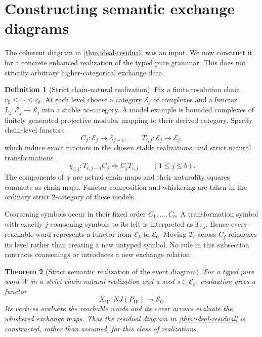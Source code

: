 \documentclass[11pt]{article}
\newtheorem{theorem}{Theorem}[section]
\theoremstyle{definition}
\newtheorem{definition}[theorem]{Definition}
\theoremstyle{remark}
\begin{document}
\section{Constructing semantic exchange diagrams}\label{sec:strict-semantics}

The coherent diagram in \cref{thm:ideal-residual} was an input. We now construct it for a concrete enhanced realization of the typed pure grammar. This does not strictify arbitrary higher-categorical exchange data.

\begin{definition}[Strict chain-natural realization]\label{def:strict-chain-realization}
Fix a finite resolution chain $r_0\le\cdots\le r_b$. At each level choose a category $\mathcal E_j$ of complexes and a functor $L_j:\mathcal E_j\to\mathcal S_j$ into a stable $\infty$-category. A model example is bounded complexes of finitely generated projective modules mapping to their derived category. Specify chain-level functors
\[
 C_j:\mathcal E_j\to\mathcal E_{j-1},\qquad
 T_{i,j}:\mathcal E_j\to\mathcal E_j,
\]
which induce exact functors in the chosen stable realizations, and strict natural transformations
\[
 \chi_{i,j}:T_{i,j-1}C_j\Longrightarrow C_jT_{i,j}
 \qquad(1\le j\le b).
\]
The components of $\chi$ are actual chain maps and their naturality squares commute as chain maps. Functor composition and whiskering are taken in the ordinary strict 2-category of these models.
\end{definition}

Coarsening symbols occur in their fixed order $C_1,\ldots,C_b$. A transformation symbol with exactly $j$ coarsening symbols to its left is interpreted as $T_{i,j}$. Hence every reachable word represents a functor from $\mathcal E_b$ to $\mathcal E_0$. Moving $T_i$ across $C_j$ reindexes its level rather than creating a new untyped symbol. No rule in this subsection contracts coarsenings or introduces a new exchange relation.

\begin{theorem}[Strict semantic realization of the event diagram]\label{thm:strict-event-realization}
For a typed pure word $W$ in a strict chain-natural realization and a seed $s\in\mathcal E_b$, evaluation gives a functor
\[
 X_W:NJ(P_W)\longrightarrow\mathcal S_0.
\]
Its vertices evaluate the reachable words and its cover arrows evaluate the whiskered exchange maps. Thus the residual diagram in \cref{thm:ideal-residual} is constructed, rather than assumed, for this class of realizations.
\end{theorem}
\end{document}
